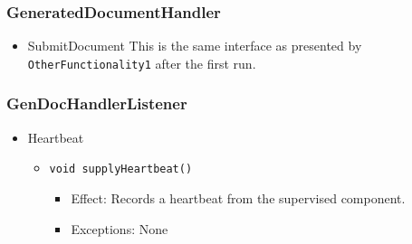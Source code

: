 \documentclass[a4paper,10pt]{article}
\begin{document}
\subsubsection*{GeneratedDocumentHandler}
\begin{itemize}
    \item SubmitDocument
    This is the same interface as presented by \texttt{OtherFunctionality1} after the first run.
\end{itemize}

\subsubsection*{GenDocHandlerListener}
\begin{itemize}
    \item Heartbeat
    \begin{itemize}
        \item \texttt{void supplyHeartbeat()}
        \begin{itemize}
            \item Effect: Records a heartbeat from the supervised component.
            \item Exceptions: None
        \end{itemize}
    \end{itemize}
\end{itemize}
\end{document}
